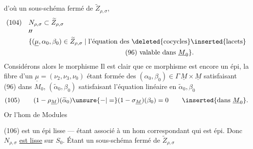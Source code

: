 d'où un sous-schéma fermé de $\widetilde Z_{\rho,\sigma}$,
\[
\begin{aligned}
(104)\quad&N_{\rho,\sigma}\subset\widetilde Z_{\rho,\sigma}\\[-2pt]
&\prime\prime\\[-2pt]
&\{(\underline\mu,\alpha_0,\beta_0)\in\widetilde Z_{\rho,\sigma}\mid
\text{l'équation des \deleted{cocycles}\inserted{lacets}}\\
&\hspace{5cm}\text{(96) valable dans }\underline M_0\}.
\end{aligned}
\]
Considérons alors le morphisme
Il est clair que ce morphisme est encore un épi, la fibre d'un
$\underline\mu=(\nu_2,\nu_3,\nu_0)$ étant formée des
$(\alpha_0,\beta_0)\in\Gamma\,\underline M\times\underline M$
satisfaisant (96) dans $M_0$,
$(\widetilde\alpha_0,\beta_0)$ satisfaisant l'équation linéaire
en $\widetilde\alpha_0,\beta_0$
\[
(105)\qquad
(1-\rho_{\underline M})(\widetilde\alpha_0)
\unsure{-|=}(1-\sigma_{\underline M})(\beta_0)=0
\qquad\inserted{\text{dans }\underline M_0}.
\]
Or l'hom de Modules

(106)
est un épi lisse --- étant associé à un hom
correspondant qui est  épi.
Donc  $N_{\rho,\sigma}$ \uline{est lisse} sur $S_0$.
 Étant un sous-schéma fermé de $\widetilde Z_{\rho,\sigma}$

